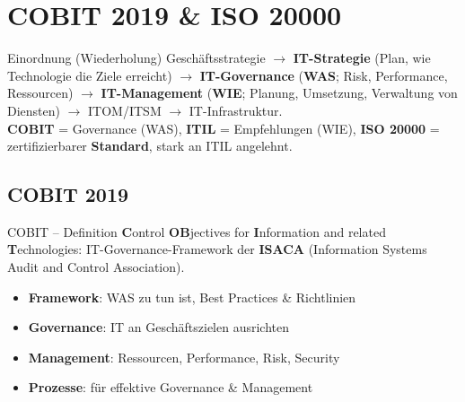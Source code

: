 \documentclass[a4paper, fontsize=7pt]{scrartcl}
\begin{document}
\section{COBIT 2019 \& ISO 20000}

\begin{subbox}{Einordnung (Wiederholung)}
Geschäftsstrategie $\to$ \textbf{IT-Strategie} (Plan, wie Technologie die
Ziele erreicht) $\to$ \textbf{IT-Governance} (\textbf{WAS}; Risk, Performance,
Ressourcen) $\to$ \textbf{IT-Management} (\textbf{WIE}; Planung, Umsetzung,
Verwaltung von Diensten) $\to$ ITOM/ITSM $\to$ IT-Infrastruktur.\\
\textbf{COBIT} = Governance (WAS), \textbf{ITIL} = Empfehlungen (WIE),
\textbf{ISO 20000} = zertifizierbarer \textbf{Standard}, stark an ITIL
angelehnt.
\end{subbox}

\subsection{COBIT 2019}

\begin{mainbox}{COBIT -- Definition}
\textbf{C}ontrol \textbf{OB}jectives for \textbf{I}nformation and related
\textbf{T}echnologies: IT-Governance-Framework der \textbf{ISACA} (Information
Systems Audit and Control Association).
\begin{itemize}
    \item \textbf{Framework}: WAS zu tun ist, Best Practices \& Richtlinien
    \item \textbf{Governance}: IT an Geschäftszielen ausrichten
    \item \textbf{Management}: Ressourcen, Performance, Risk, Security
    \item \textbf{Prozesse}: für effektive Governance \& Management
\end{itemize}
\end{mainbox}
\end{document}
